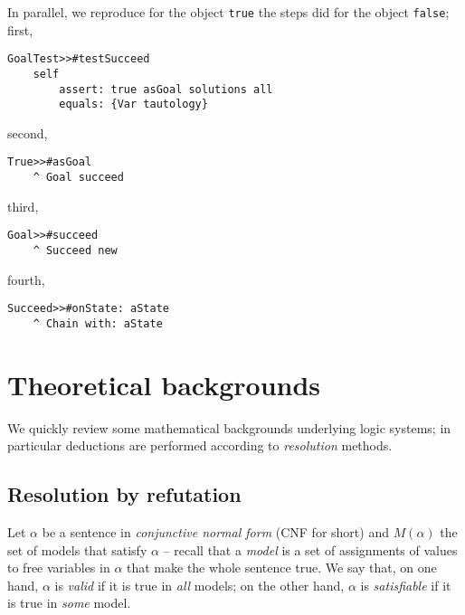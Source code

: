 \documentclass[a4paper,12pt]{article}
\begin{document}
In parallel, we reproduce for the object \Verb|true| the steps did for
the object \Verb|false|; first,
\begin{verbatim}
GoalTest>>#testSucceed
    self
        assert: true asGoal solutions all
        equals: {Var tautology}
\end{verbatim}
second,
\begin{verbatim}
True>>#asGoal
    ^ Goal succeed
\end{verbatim}
third,
\begin{verbatim}
Goal>>#succeed
    ^ Succeed new
\end{verbatim}
fourth,
\begin{verbatim}
Succeed>>#onState: aState
    ^ Chain with: aState
\end{verbatim}

\section{Theoretical backgrounds}

We quickly review some mathematical backgrounds underlying logic systems;
in particular deductions are performed according to \emph{resolution} methods.

\subsection{Resolution by refutation}

Let $\alpha$ be a sentence in \emph{conjunctive normal
form} (CNF for short) and $M(\alpha)$ the set of models that satisfy $\alpha$
-- recall that a \emph{model} is a set of assignments of values to free
variables in $\alpha$ that make the whole sentence true.  We say that, on one
hand, $\alpha$ is \textit{valid} if it is true in \textit{all} models; on the
other hand, $\alpha$ is \textit{satisfiable} if it is true in \textit{some}
model.
\end{document}
